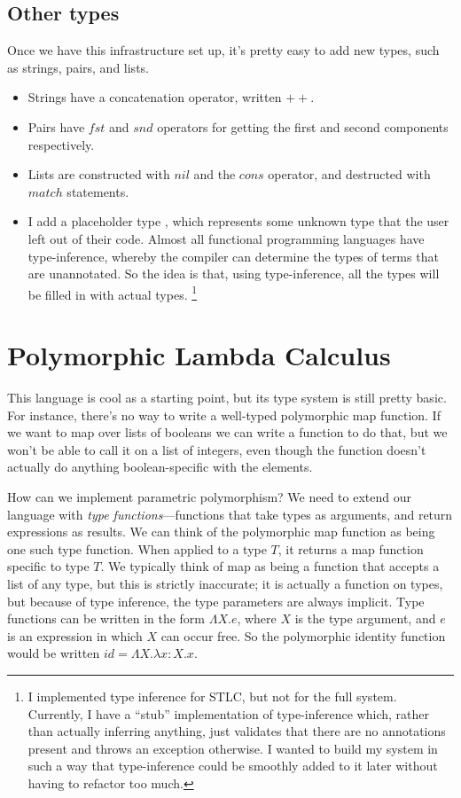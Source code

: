 \message{ !name(report.tex)}\documentclass[pageno]{jpaper}
\begin{document}
{\subsection{Other types}
Once we have this infrastructure set up, it's pretty easy to add new types, such as strings, pairs, and lists.
\begin{itemize}
\item Strings have a concatenation operator, written $++$.
\item Pairs have $fst$ and $snd$ operators for getting the first and second components respectively.
\item Lists are constructed with $nil$ and the $cons$ operator, and destructed with $match$ statements.
\item I add a placeholder type , which represents some unknown type that the user
left out of their code. Almost all functional
programming languages have type-inference, whereby the compiler can determine the types of terms that
are unannotated. So the idea is that, using type-inference, all the  types will be filled
in with actual types. \footnote{I implemented type inference for STLC, but not for the full system. Currently,
I have a ``stub'' implementation of type-inference which, rather than actually inferring anything, just
validates that there are no  annotations present and throws an exception otherwise. I wanted
to build my system in such a way that type-inference could be smoothly added to it later without having to
refactor too much.}
\end{itemize}

\section{Polymorphic Lambda Calculus}
This language is cool as a starting point, but its type system is still pretty basic.
For instance, there's no way to write a well-typed polymorphic map function. If we want to map over lists of
booleans we can write a function to do that, but we won't be able to call it on a list of integers,
even though the function doesn't actually do anything boolean-specific with the elements.

How can we implement parametric polymorphism? We need to extend our language with \textit{type functions}---functions that take types as arguments, and return expressions as results. 
We can think of the polymorphic map function as being one such type function. When applied to a type $T$, it
returns a map function specific to type $T$.
We typically think of map as being a function that accepts a list of any type, but this is strictly
inaccurate; it is actually a function on types, but because of type inference, the type parameters are
always implicit. Type functions can be written in the form $\Lambda X.e$, where $X$ is the type argument,
and $e$ is an expression in which $X$ can occur free. So the polymorphic identity function would be
written $id = \Lambda X.\lambda x:X.x$.

}
\end{document}

